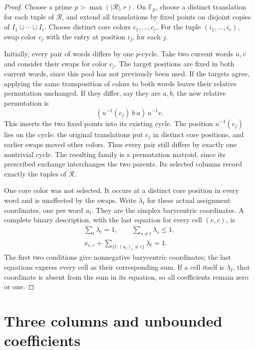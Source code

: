 \begin{proof}
Choose a prime $p>\max(|\mathcal R|,r)$. On $\mathbb F_p$, choose
a distinct translation for each tuple of $\mathcal R$, and extend
all translations by fixed points on disjoint copies of
$I_1\sqcup\dotsb\sqcup I_r$.
Choose distinct core colors $c_1,\dotsc,c_r$. For the tuple
$(i_1,\dotsc,i_r)$, swap color $c_j$ with the entry at position
$i_j$, for each $j$.

Initially, every pair of words differs by one $p$-cycle. Take two
current words $u,v$ and consider their swaps for color $c_j$.
The target positions are fixed in
both current words, since this pool has not previously been used.
If the targets agree, applying the same transposition of colors
to both words leaves their relative permutation unchanged. If they
differ, say they are $a,b$, the new relative permutation is
\[
 (u^{-1}(c_j)\ b\ a)\,u^{-1}v.
\]
This inserts the two fixed points into its existing cycle.
The position $u^{-1}(c_j)$ lies on the cycle: the original translations put
$c_j$ in distinct core positions, and earlier swaps moved other colors.
Thus every pair still differs by exactly one nontrivial cycle.
The resulting family is a permutation matroid, since its prescribed
exchange interchanges the two parents. Its selected columns record
exactly the tuples of $\mathcal R$.

One core color was not selected. It occurs at a distinct core position
in every word and is unaffected by the swaps. Write $\lambda_t$ for
these actual assignment coordinates, one per word $u_t$. They are
the simplex barycentric coordinates. A complete binary description,
with the last equation for every cell $(e,c)$, is
\[
 \begin{gathered}
 \sum_t\lambda_t=1,\qquad
 \sum_{s\ne t}\lambda_s\leq1,\\
 x_{e,c}+\sum_{\{t:(u_t)_e\ne c\}}\lambda_t=1.
 \end{gathered}
\]
The first two conditions give nonnegative barycentric coordinates;
the last equations express every cell as their corresponding sum.
If a cell itself is $\lambda_t$, that coordinate is absent from
the sum in its equation, so all coefficients remain zero or one.
\end{proof}

\section[threeColumnObstruction]{Three columns and unbounded coefficients}

